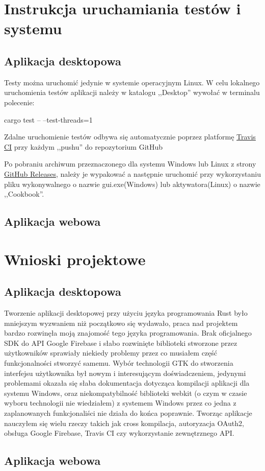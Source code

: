 \documentclass[12pt,a4paper]{article}
\begin{document}
	\section{Instrukcja uruchamiania testów i systemu}
		\subsection{Aplikacja desktopowa}

			\indent Testy można uruchomić jedynie w systemie operacyjnym Linux. W celu lokalnego uruchomienia testów aplikacji należy w katalogu ,,Desktop''
			wywołać w terminalu polecenie:
			\begin{tcolorbox}[minipage,colback=white,arc=0pt,outer arc=0pt, fontupper=\normalsize]
				\center					
					cargo test -- --test-threads=1
			\end{tcolorbox}

			\indent Zdalne uruchomienie testów odbywa się automatycznie poprzez platformę \href{https://www.travis-ci.com/github/MacKarp/Cookbook}{Travis CI} 
			przy każdym ,,pushu'' do repozytorium GitHub
			 
			\indent Po pobraniu archiwum przeznaczonego dla systemu Windows lub Linux z strony \href{https://github.com/MacKarp/Cookbook/releases}{GitHub Releases},
			należy je wypakować a następnie uruchomić przy wykorzystaniu pliku wykonywalnego o nazwie gui.exe(Windows) lub aktywatora(Linux) o nazwie ,,Cookbook''. 		
		\subsection{Aplikacja webowa}	 
	
	\newpage

	\section{Wnioski projektowe}
		\subsection{Aplikacja desktopowa}
	
		\indent Tworzenie aplikacji desktopowej przy użyciu języka programowania Rust było mniejszym wyzwaniem niż początkowo się wydawało, praca nad projektem bardzo
		rozwinęła moją znajomość tego języka programowania. Brak oficjalnego SDK do API Google Firebase i słabo rozwinięte biblioteki stworzone przez użytkowników
		sprawiały niekiedy problemy przez co musiałem część funkcjonalności stworzyć samemu. Wybór technologii GTK do stworzenia interfejsu użytkownika był nowym i interesującym
		doświadczeniem, jedynymi problemami okazała się słaba dokumentacja dotycząca kompilacji aplikacji dla systemu Windows, oraz niekompatybilność biblioteki webkit
		(o czym w czasie wyboru technologii nie wiedziałem) z systemem Windows przez co jedna z zaplanowanych funkcjonaliści nie działa do końca poprawnie. 
		Tworząc aplikacje nauczyłem się wielu rzeczy takich jak cross kompilacja, autoryzacja OAuth2, obsługa Google Firebase, Travis CI czy wykorzystanie zewnętrznego API.

		\subsection{Aplikacja webowa}	 
\end{document}
